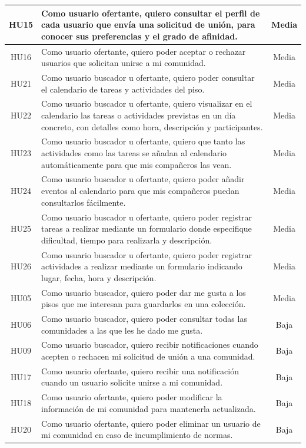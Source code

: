 \begin{longtable}{|c|p{8cm}|c|}
\hline
HU15 & Como usuario ofertante, quiero consultar el perfil de cada usuario que envía una solicitud de unión, para conocer sus preferencias y el grado de afinidad. & Media \\
\hline
HU16 & Como usuario ofertante, quiero poder aceptar o rechazar usuarios que solicitan unirse a mi comunidad. & Media \\
\hline
HU21 & Como usuario buscador u ofertante, quiero poder consultar el calendario de tareas y actividades del piso. & Media \\
\hline
HU22 & Como usuario buscador u ofertante, quiero visualizar en el calendario las tareas o actividades previstas en un día concreto, con detalles como hora, descripción y participantes. & Media \\
\hline
HU23 & Como usuario buscador u ofertante, quiero que tanto las actividades como las tareas se añadan al calendario automáticamente para que mis compañeros las vean. & Media \\
\hline
HU24 & Como usuario buscador u ofertante, quiero poder añadir eventos al calendario para que mis compañeros puedan consultarlos fácilmente. & Media \\
\hline
HU25 & Como usuario buscador u ofertante, quiero poder registrar tareas a realizar mediante un formulario donde especifique dificultad, tiempo para realizarla y descripción. & Media \\
\hline
HU26 & Como usuario buscador u ofertante, quiero poder registrar actividades a realizar mediante un formulario indicando lugar, fecha, hora y descripción. & Media \\
\hline
HU05 & Como usuario buscador, quiero poder dar me gusta a los pisos que me interesan para guardarlos en una colección. & Media \\
\hline
HU06 & Como usuario buscador, quiero poder consultar todas las comunidades a las que les he dado me gusta. & Baja \\
\hline
HU09 & Como usuario buscador, quiero recibir notificaciones cuando acepten o rechacen mi solicitud de unión a una comunidad. & Baja \\
\hline
HU17 & Como usuario ofertante, quiero recibir una notificación cuando un usuario solicite unirse a mi comunidad. & Baja \\
\hline
HU18 & Como usuario ofertante, quiero poder modificar la información de mi comunidad para mantenerla actualizada. & Baja \\
\hline
HU20 & Como usuario ofertante, quiero poder eliminar un usuario de mi comunidad en caso de incumplimiento de normas. & Baja \\

\end{longtable}

